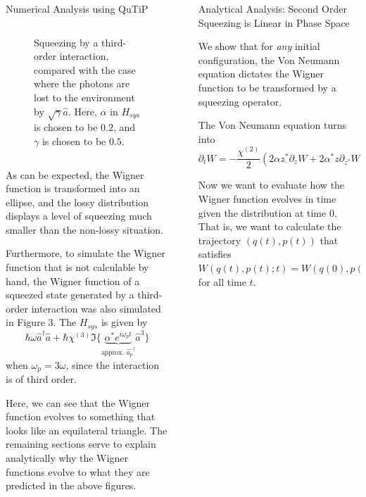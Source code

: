 \documentclass[final]{beamer}
\newlength{\sepwidth}
\newlength{\colwidth}
\newcommand{\separatorcolumn}{\begin{column}{\sepwidth}\end{column}}
\begin{document}
\begin{frame}[t]
\begin{columns}[t]
\begin{column}{\colwidth}
\begin{block}{Numerical Analysis using QuTiP}
\begin{columns}
\begin{column}{0.5\textwidth}
\begin{figure}
              \caption{Squeezing by a third-order interaction, compared with the case where the photons are lost to the environment by $\sqrt{\gamma}\hat{a}$. Here, $\alpha$ in $H_{sys}$ is chosen to be $0.2$, and $\gamma$ is chosen to be $0.5$.}
            \end{figure}
          \end{column}
        \end{columns}
        As can be expected, the Wigner function is transformed into an ellipse, and the lossy distribution displays a level of squeezing much smaller than the non-lossy situation.

        Furthermore, to simulate the Wigner function that is not calculable by hand, the Wigner function of a squeezed state generated by a third-order interaction was also simulated in Figure 3.
        The $H_{sys}$ is given by
        \[\hbar\omega\hat{a}^{\dag}\hat{a}+\hbar\chi^{(3)}\Im\{\underbrace{\alpha^{*} e^{i\omega_{p}t}}_{\text{approx. }\hat{a_{p}}^{\dag}}\hat{a}^{3}\}\]
        when $\omega_{p}=3\omega$, since the interaction is of third order.

        Here, we can see that the Wigner function evolves to something that looks like an equilateral triangle.
        The remaining sections serve to explain analytically why the Wigner functions evolve to what they are predicted in the above figures.
      \end{block}

    \end{column}

    \separatorcolumn

    \begin{column}{\colwidth}

      \begin{block}{Analytical Analysis: Second Order Squeezing is Linear in Phase Space}

        We show that for \textit{any} initial configuration, the Von Neumann equation dictates the Wigner function to be transformed by a squeezing operator.

        The Von Neumann equation turns into
        \[\partial_{t}W=-\frac{\chi^{(2)}}{2}(2\alpha z^{*}\partial_{z}W+2\alpha^{*}z\partial_{z^{*}}W)\]

        Now we want to evaluate how the Wigner function evolves in time given the distribution at time $0$.
        That is, we want to calculate the trajectory $(q(t), p(t))$ that satisfies $W(q(t),p(t);t)=W(q(0),p(0);0)$
        for all time $t$.


\end{block}
\end{column}
\end{columns}
\end{frame}
\end{document}
